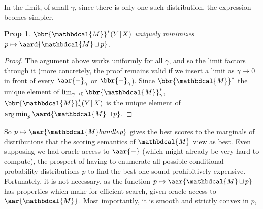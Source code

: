 \documentclass{article}
\theoremstyle{plain}
\newtheorem{prop}[theorem]{Prop}
\theoremstyle{definition}
\theoremstyle{remark}
\DeclareMathOperator*{\argmin}{arg\,min}
\newcommand{\dg}[1]{\mathbdcal{#1}}
\newcommand\smid{\!\mid\!}
\DeclareMathOperator{\bundle}{\sqcup}
\begin{document}
In the limit, of small $\gamma$, since there is only one such distribution,
the expression beomes simpler. 
\begin{prop}
	$\displaystyle
		\bbr{\dg M}^*(Y \smid X)
	$ uniquely minimizes $p \mapsto \aard{\dg M \bundle p}$.
\end{prop}
\begin{proof}
	The argument above works uniformly for all $\gamma$, and so the limit
	factors through it (more concretely, the proof remains valid if we insert a limit as $\gamma \to 0$ in front of every $\aar{-}_\gamma$ or $\bbr{-}_\gamma$). Since $\bbr{\dg M}^*$ the unique element of $\lim_{\gamma\to0}\bbr{\dg M}_\gamma^*$, $\bbr{\dg M}_\gamma^*(Y\smid X)$ 
	is the unique element of $\argmin_p \aard{\dg M \bundle p}$.
\end{proof}

So $p \mapsto \aar{\dg M bundle p}$ gives the best scores to the marginals of
distributions that the scoring semantics of $\dg M$ view as best. Even supposing
we had oracle access to $\aar{-}$ (which might already be very hard to compute),
the prospect of having to enumerate all possible conditional probability
distributions $p$ to find the best one sound prohibitively expensive.
Fortunately, it is not necessary, as the function $p \mapsto \aar{\dg M \bundle
p}$ has properties which make for efficient search,
given oracle access to $\aar{\dg M}$.  Most importantly, it is smooth and 
%
strictly convex
%
in $p$, 
\end{document}
